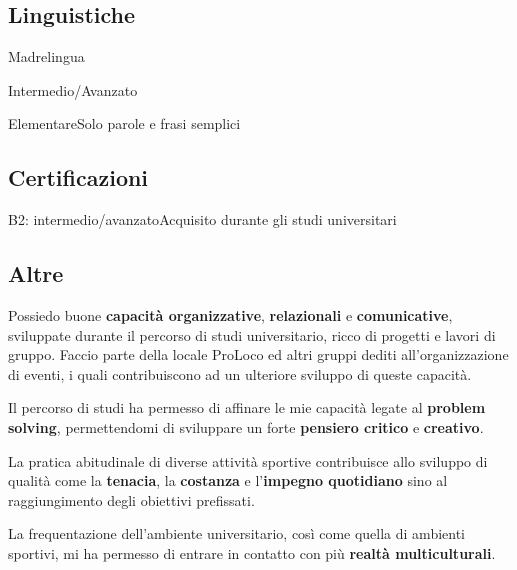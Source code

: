 \subsection{Linguistiche}

{Madrelingua}{}

{Intermedio/Avanzato}{}

{Elementare}{Solo parole e frasi semplici}



\subsection{Certificazioni}

{B2: intermedio/avanzato}{Acquisito durante gli studi universitari}



\subsection{Altre}

\cvitem{}
{Possiedo buone \textbf{capacità organizzative}, \textbf{relazionali} e
\textbf{comunicative}, sviluppate durante il percorso di studi universitario,
ricco di progetti e lavori di gruppo. Faccio parte della locale ProLoco ed altri
gruppi dediti all'organizzazione di eventi, i quali contribuiscono ad un
ulteriore sviluppo di queste capacità.}

\cvitem{}
{Il percorso di studi ha permesso di affinare le mie capacità legate al
\textbf{problem solving}, permettendomi di sviluppare un forte \textbf{pensiero
critico} e \textbf{creativo}.}

\cvitem{}
{La pratica abitudinale di diverse attività sportive contribuisce allo sviluppo
di qualità come la \textbf{tenacia}, la \textbf{costanza} e l'\textbf{impegno
quotidiano} sino al raggiungimento degli obiettivi prefissati.}

\cvitem{}
{La frequentazione dell'ambiente universitario, così come quella di ambienti
sportivi, mi ha permesso di entrare in contatto con più \textbf{realtà
multiculturali}.}
